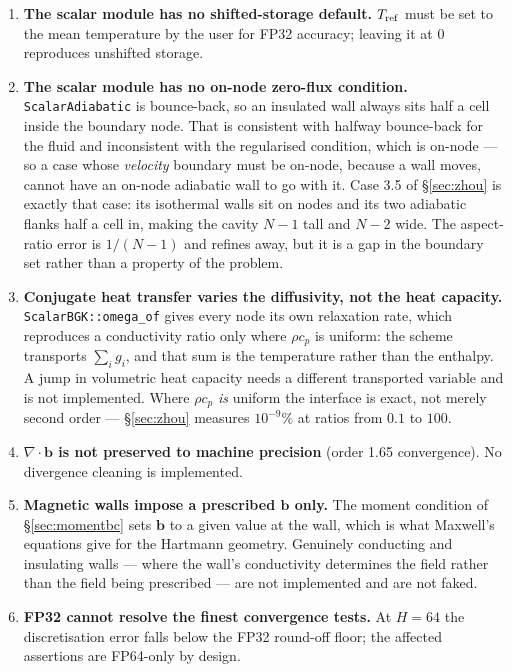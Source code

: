 \documentclass[11pt,a4paper]{article}
\newcommand{\code}[1]{\texttt{\small #1}}
\newcommand{\bb}{\bm{b}}
\begin{document}
\begin{enumerate}[leftmargin=1.4em,itemsep=4pt]
\item \textbf{The scalar module has no shifted-storage default.}
  $T_{\rm ref}$ must be set to the mean temperature by the user for FP32 accuracy;
  leaving it at $0$ reproduces unshifted storage.

\item \textbf{The scalar module has no on-node zero-flux condition.}
  \code{ScalarAdiabatic} is bounce-back, so an insulated wall always sits half a
  cell inside the boundary node. That is consistent with halfway bounce-back for
  the fluid and inconsistent with the regularised condition, which is on-node ---
  so a case whose \emph{velocity} boundary must be on-node, because a wall moves,
  cannot have an on-node adiabatic wall to go with it. Case 3.5 of
  \S\ref{sec:zhou} is exactly that case: its isothermal walls sit on nodes and
  its two adiabatic flanks half a cell in, making the cavity $N-1$ tall and $N-2$
  wide. The aspect-ratio error is $1/(N-1)$ and refines away, but it is a gap in
  the boundary set rather than a property of the problem.

\item \textbf{Conjugate heat transfer varies the diffusivity, not the heat
  capacity.} \code{ScalarBGK::omega\_of} gives every node its own relaxation
  rate, which reproduces a conductivity ratio only where $\rho c_p$ is uniform:
  the scheme transports $\sum_i g_i$, and that sum is the temperature rather
  than the enthalpy. A jump in volumetric heat capacity needs a different
  transported variable and is not implemented. Where $\rho c_p$ \emph{is}
  uniform the interface is exact, not merely second order --- \S\ref{sec:zhou}
  measures $10^{-9}\%$ at ratios from $0.1$ to $100$.

\item \textbf{$\nabla\!\cdot\!\bb$ is not preserved to machine precision}
  (order 1.65 convergence). No divergence cleaning is implemented.

\item \textbf{Magnetic walls impose a prescribed $\bb$ only.} The moment
  condition of \S\ref{sec:momentbc} sets $\bb$ to a given value at the wall,
  which is what Maxwell's equations give for the Hartmann geometry. Genuinely
  conducting and insulating walls --- where the wall's conductivity determines
  the field rather than the field being prescribed --- are not implemented and
  are not faked.

\item \textbf{FP32 cannot resolve the finest convergence tests.} At $H=64$ the
  discretisation error falls below the FP32 round-off floor; the affected
  assertions are FP64-only by design.


\end{enumerate}
\end{document}
